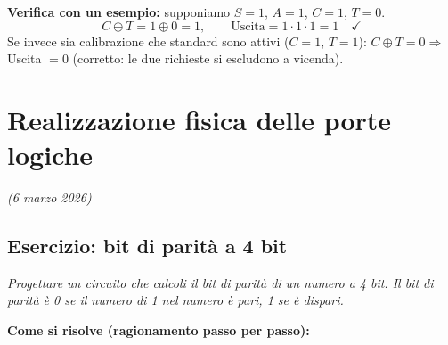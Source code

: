 \documentclass[11pt,a4paper]{report}
\begin{document}
\noindent\textbf{Verifica con un esempio:} supponiamo $S=1$, $A=1$, $C=1$, $T=0$.
\[
    C \oplus T = 1 \oplus 0 = 1, \qquad \text{Uscita} = 1 \cdot 1 \cdot 1 = 1 \quad \checkmark
\]
Se invece sia calibrazione che standard sono attivi ($C=1$, $T=1$): $C \oplus T = 0 \Rightarrow$ Uscita $= 0$ (corretto: le due richieste si escludono a vicenda).

\chapter{Realizzazione fisica delle porte logiche}
\textit{(6 marzo 2026)}

\section{Esercizio: bit di parità a 4 bit}

\textit{Progettare un circuito che calcoli il bit di parità di un numero a 4 bit. Il bit di parità è 0 se il numero di 1 nel numero è pari, 1 se è dispari.}

\medskip
\noindent\textbf{Come si risolve (ragionamento passo per passo):}
\end{document}

